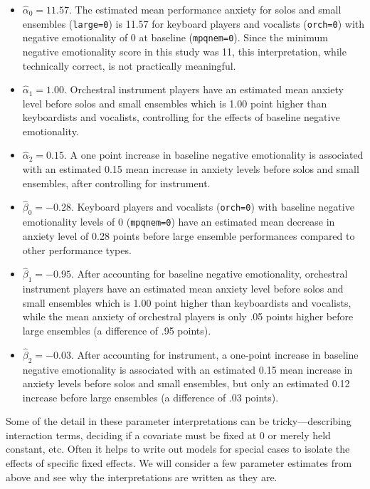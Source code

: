 \documentclass[
]{krantz}
\providecommand{\tightlist}{%
  \setlength{\itemsep}{0pt}\setlength{\parskip}{0pt}}
\begin{document}
\begin{itemize}
\tightlist
\item
  \(\hat{\alpha}_{0} = 11.57\). The estimated mean performance anxiety for solos and small ensembles (\texttt{large=0}) is 11.57 for keyboard players and vocalists (\texttt{orch=0}) with negative emotionality of 0 at baseline (\texttt{mpqnem=0}). Since the minimum negative emotionality score in this study was 11, this interpretation, while technically correct, is not practically meaningful.
\item
  \(\hat{\alpha}_{1} = 1.00\). Orchestral instrument players have an estimated mean anxiety level before solos and small ensembles which is 1.00 point higher than keyboardists and vocalists, controlling for the effects of baseline negative emotionality.
\item
  \(\hat{\alpha}_{2} = 0.15\). A one point increase in baseline negative emotionality is associated with an estimated 0.15 mean increase in anxiety levels before solos and small ensembles, after controlling for instrument.
\item
  \(\hat{\beta}_{0} = -0.28\). Keyboard players and vocalists (\texttt{orch=0}) with baseline negative emotionality levels of 0 (\texttt{mpqnem=0}) have an estimated mean decrease in anxiety level of 0.28 points before large ensemble performances compared to other performance types.
\item
  \(\hat{\beta}_{1} = -0.95\). After accounting for baseline negative emotionality, orchestral instrument players have an estimated mean anxiety level before solos and small ensembles which is 1.00 point higher than keyboardists and vocalists, while the mean anxiety of orchestral players is only .05 points higher before large ensembles (a difference of .95 points).
\item
  \(\hat{\beta}_{2} = -0.03\). After accounting for instrument, a one-point increase in baseline negative emotionality is associated with an estimated 0.15 mean increase in anxiety levels before solos and small ensembles, but only an estimated 0.12 increase before large ensembles (a difference of .03 points).
\end{itemize}

Some of the detail in these parameter interpretations can be tricky---describing interaction terms, deciding if a covariate must be fixed at 0 or merely held constant, etc. Often it helps to write out models for special cases to isolate the effects of specific fixed effects. We will consider a few parameter estimates from above and see why the interpretations are written as they are.
\end{document}
